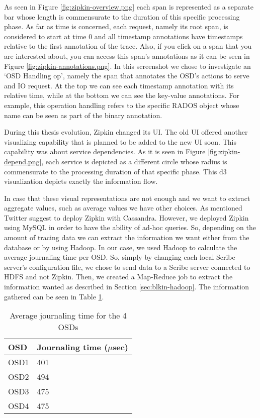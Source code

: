 As seen in Figure \ref{fig:zipkin-overview.png} each span is represented as a
separate bar whose length is commensurate to the duration of this specific
processing phase. As far as time is concerned, each request, namely its root
span, is considered to start at time 0 and all timestamp annotations have
timestamps relative to the first annotation of the trace. Also, if you click on
a span that you are interested about, you can access this span's annotations as
it can be seen in Figure \ref{fig:zipkin-annotations.png}. In this screenshot we
chose to investigate an `OSD Handling op', namely the span that annotates the
OSD's actions to serve and IO request. At the top we can see each timestamp
annotation with its relative time, while at the bottom we can see the key-value
annotations. For example, this operation handling refers to the specific RADOS
object whose name can be seen as part of the binary annotation.


During this thesis evolution, Zipkin changed its UI. The old UI offered another
visualizing capability that is planned to be added to the new UI soon. This
capability was about service dependencies. As it is seen in Figure
\ref{fig:zipkin-depend.png}, each service is depicted as a different circle
whose radius is commensurate to the processing duration of that specific phase.
This d3 visualization depicts exactly the information flow.


In case that these visual representations are not enough and we want to extract
aggregate values, such as average values we have other choices. As mentioned
Twitter suggest to deploy Zipkin with Cassandra. However, we deployed Zipkin
using MySQL in order to have the ability of ad-hoc queries. So, depending on the
amount of tracing data we can extract the information we want either from the
database or by using Hadoop. In our case, we used Hadoop to calculate the
average journaling time per OSD. So, simply by changing each local Scribe
server's configuration file, we chose to send data to a Scribe server connected
to HDFS and not Zipkin. Then, we created a Map-Reduce job to extract the
information wanted as described in Section \ref{sec:blkin-hadoop}. The
information gathered can be seen in Table \ref{tab:hadoop-journal}.

\begin{table}[H]
    \centering
    \begin{tabular}{ | l | l | }
        \hline
        OSD  & Journaling time ($\mu$sec)  \\ \hline \hline
        OSD1 & 401  \\ \hline
        OSD2 & 494  \\ \hline
        OSD3 & 475  \\ \hline
        OSD4 & 475  \\ \hline
    \end{tabular}
    \caption{Average journaling time for the 4 OSDs}
    \label{tab:hadoop-journal}
\end{table}

